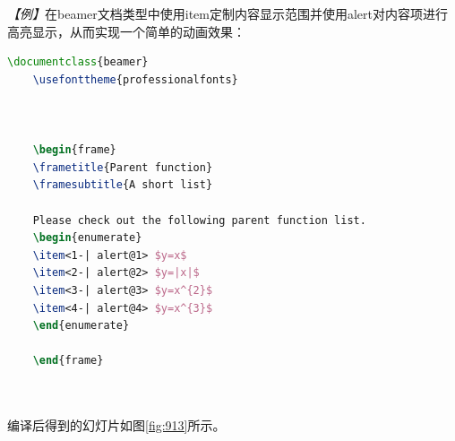 \emph{【例】}在beamer文档类型中使用item定制内容显示范围并使用alert对内容项进行高亮显示，从而实现一个简单的动画效果：
\begin{lstlisting}[language=TeX]
    \documentclass{beamer}
    \usefonttheme{professionalfonts}

    

    \begin{frame}
    \frametitle{Parent function}
    \framesubtitle{A short list}

    Please check out the following parent function list.
    \begin{enumerate}
    \item<1-| alert@1> $y=x$
    \item<2-| alert@2> $y=|x|$
    \item<3-| alert@3> $y=x^{2}$
    \item<4-| alert@4> $y=x^{3}$
    \end{enumerate}

    \end{frame}

    
\end{lstlisting}

编译后得到的幻灯片如图\ref{fig:913}所示。

